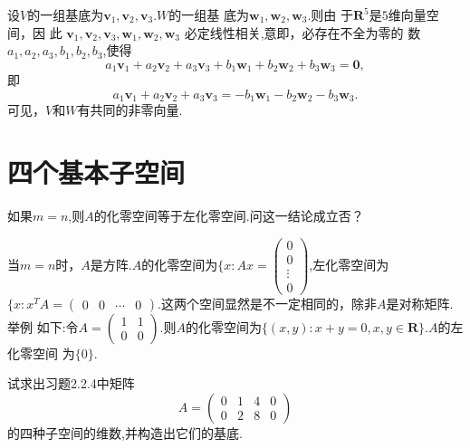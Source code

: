 ﻿\documentclass{book} \usepackage{exsheets} \usepackage{xeCJK}
\begin{document}
\begin{solution}
  设$V$的一组基底为$\mathbf{v}_1,\mathbf{v}_2,\mathbf{v}_3$.$W$的一组基
  底为$\mathbf{w}_1,\mathbf{w}_2,\mathbf{w}_{3}$.则由
  于$\mathbf{R}^{5}$是$5$维向量空间，因
  此
  $\mathbf{v}_1,\mathbf{v}_2,\mathbf{v}_{3},\mathbf{w}_1,\mathbf{w}_2,\mathbf{w}_{3}$
  必定线性相关,意即，必存在不全为零的
  数$a_{1},a_{2},a_{3},b_{1},b_{2},b_{3}$,使得
$$
a_{1}\mathbf{v}_{1}+a_{2}\mathbf{v}_{2}+a_{3}\mathbf{v}_{3}+b_{1}\mathbf{w}_{1}+b_{2}\mathbf{w}_{2}+b_{3}\mathbf{w}_{3}=\mathbf{0},
$$
即
$$
a_{1}\mathbf{v}_{1}+a_{2}\mathbf{v}_{2}+a_{3}\mathbf{v}_{3}=-b_{1}\mathbf{w}_{1}-b_{2}\mathbf{w}_{2}-b_{3}\mathbf{w}_{3}.
$$
可见，$V$和$W$有共同的非零向量.
\end{solution}
\section{四个基本子空间}
\begin{question}
  如果$m=n$,则$A$的化零空间等于左化零空间.问这一结论成立否？
\end{question}
\begin{solution}
  当$m=n$时，$A$是方阵.$A$的化零空间为$\{x:Ax=
  \begin{pmatrix}
    0\\
    0\\
    \vdots\\
    0
  \end{pmatrix}
  $,左化零空间为$\{x:x^{T}A=
  \begin{pmatrix}
    0&0&\cdots&0
  \end{pmatrix}.  $这两个空间显然是不一定相同的，除非$A$是对称矩阵.举例
  如下:令$A=
  \begin{pmatrix}
    1&1\\
    0&0
  \end{pmatrix}.
  $则$A$的化零空间为$\{(x,y):x+y=0,x,y\in \mathbf{R}\}$.$A$的左化零空间
  为$\{0\}$.
\end{solution}
\begin{question}
  试求出习题2.2.4中矩阵
$$
A=
\begin{pmatrix}
  0&1&4&0\\
  0&2&8&0
\end{pmatrix}
$$
的四种子空间的维数,并构造出它们的基底.
\end{question}
\end{document}
